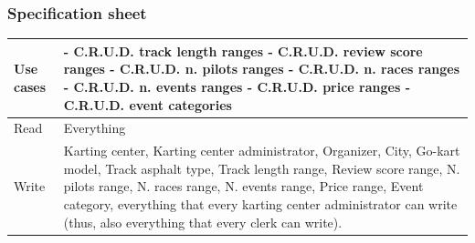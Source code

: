 \documentclass{beamer}
\begin{document}
\begin{frame}
    \frametitle{Specification sheet}
    \begin{table}
        \tiny
        \begin{tabular}{|p{2cm}|p{6cm}|}
        \hline
        Use cases &
        - C.R.U.D. track length ranges \newline
        - C.R.U.D. review score ranges \newline
        - C.R.U.D. n. pilots ranges \newline
        - C.R.U.D. n. races ranges \newline
        - C.R.U.D. n. events ranges \newline
        - C.R.U.D. price ranges \newline
        - C.R.U.D. event categories \\
        \hline
        Read & Everything \\
        \hline
        Write & Karting center, Karting center administrator, Organizer, City, Go-kart model, Track asphalt type, Track length range, Review score range, N. pilots range,
        N. races range, N. events range, Price range, Event category, everything that every karting center administrator can write (thus, also everything that every clerk can write).\\
        \hline
        \end{tabular}
    \end{table}
\end{frame}
\end{document}
